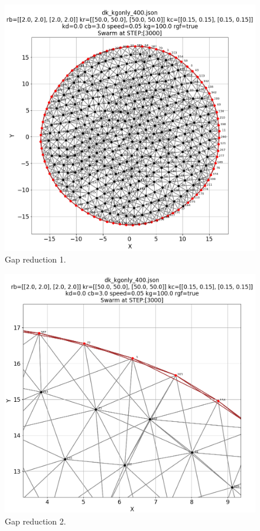 \documentclass[12pt,a4paper]{IEEEtran}
\begin{document}
\begin{figure}[H]
	\begin{center}
		\includegraphics[width=1.0\linewidth]{figures/gap1}
	\end{center}
	\caption{Gap reduction 1. \label{fig:gap1}}
\end{figure}

\begin{figure}[H]
	\begin{center}
		\includegraphics[width=1.0\linewidth]{figures/gap2}
	\end{center}
	\caption{Gap reduction 2. \label{fig:gap2}}
\end{figure}
\end{document}
